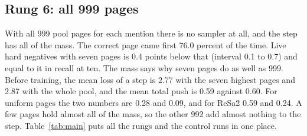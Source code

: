 \documentclass[11pt]{article}
\theoremstyle{definition}
\begin{document}
\subsection{Rung 6: all 999 pages}
\label{sec:why}

With all 999 pool pages for each mention there is no sampler at all, and the step has all of the mass. The correct page came first 76.0 percent of the time. Live hard negatives with seven pages is 0.4 points below that (interval 0.1 to 0.7) and equal to it in recall at ten. The mass says why seven pages do as well as 999. Before training, the mean loss of a step is 2.77 with the seven highest pages and 2.87 with the whole pool, and the mean total push is 0.59 against 0.60. For uniform pages the two numbers are 0.28 and 0.09, and for ReSa2 0.59 and 0.24. A few pages hold almost all of the mass, so the other 992 add almost nothing to the step. Table~\ref{tab:main} puts all the rungs and the control runs in one place.
\end{document}
